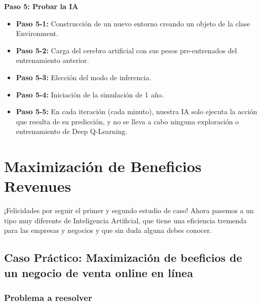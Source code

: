 \documentclass[]{book}
\providecommand{\tightlist}{%
  \setlength{\itemsep}{0pt}\setlength{\parskip}{0pt}}
\begin{document}
\textbf{Paso 5: Probar la IA}

\begin{itemize}
\tightlist
\item
  \textbf{Paso 5-1:} Construcción de un nuevo entorno creando un objeto de la clase Environment.
\item
  \textbf{Paso 5-2:} Carga del cerebro artificial con sus pesos pre-entrenados del entrenamiento anterior.
\item
  \textbf{Paso 5-3:} Elección del modo de inferencia.
\item
  \textbf{Paso 5-4:} Iniciación de la simulación de 1 año.
\item
  \textbf{Paso 5-5:} En cada iteración (cada minuto), nuestra IA solo ejecuta la acción que resulta de su predicción, y no se lleva a cabo ninguna exploración o entrenamiento de Deep Q-Learning.
\end{itemize}

\hypertarget{maximizaciuxf3n-de-beneficios-revenues}{%
\chapter{Maximización de Beneficios Revenues}\label{maximizaciuxf3n-de-beneficios-revenues}}

¡Felicidades por seguir el primer y segundo estudio de caso! Ahora pasemos a un tipo muy diferente de Inteligencia Artificial, que tiene una eficiencia tremenda para las empresas y negocios y que sin duda alguna debes conocer.

\hypertarget{caso-pruxe1ctico-maximizaciuxf3n-de-beeficios-de-un-negocio-de-venta-online-en-luxednea}{%
\section{Caso Práctico: Maximización de beeficios de un negocio de venta online en línea}\label{caso-pruxe1ctico-maximizaciuxf3n-de-beeficios-de-un-negocio-de-venta-online-en-luxednea}}

\hypertarget{problema-a-reesolver}{%
\subsection{Problema a reesolver}\label{problema-a-reesolver}}
\end{document}
